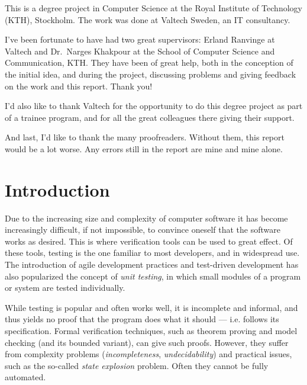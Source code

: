\documentclass[a4paper,11pt]{kth-mag}
\begin{document}
This is a degree project in Computer Science at the Royal Institute of
Technology (KTH), Stockholm. The work was done at Valtech Sweden, an IT
consultancy.

I've been fortunate to have had two great supervisors: Erland Ranvinge at
Valtech and Dr.\ Narges Khakpour at the School of Computer Science and
Communication, KTH\@. They have been of great help, both in the conception of the
initial idea, and during the project, discussing problems and giving feedback
on the work and this report. Thank you!

I'd also like to thank Valtech for the opportunity to do this degree project as
part of a trainee program, and for all the great colleagues there giving their
support.

And last, I'd like to thank the many proofreaders. Without them, this report
would be a lot worse. Any errors still in the report are mine and mine alone.

\clearpage

\pagestyle{newchap}
\tableofcontents*
\mainmatter





\pagestyle{newchap}
\chapter{Introduction} \label{chapter-introduction}

Due to the increasing size and complexity of computer software it has become
increasingly difficult, if not impossible, to convince oneself that the
software works as desired. This is where verification tools can be used to
great effect. Of these tools, testing is the one familiar to most developers,
and in widespread use. The introduction of agile development practices and
test-driven development has also popularized the concept of \textit{unit
testing}, in which small modules of a program or system are tested
individually.

While testing is popular and often works well, it is incomplete and informal,
and thus yields no proof that the program does what it should --- i.e. follows
its specification. Formal verification techniques, such as theorem proving and
model checking (and its bounded variant), can give such proofs. However, they
suffer from complexity problems (\textit{incompleteness},
\textit{undecidability}) and practical issues, such as the so-called
\textit{state explosion} problem. Often they cannot be fully automated.
\end{document}
